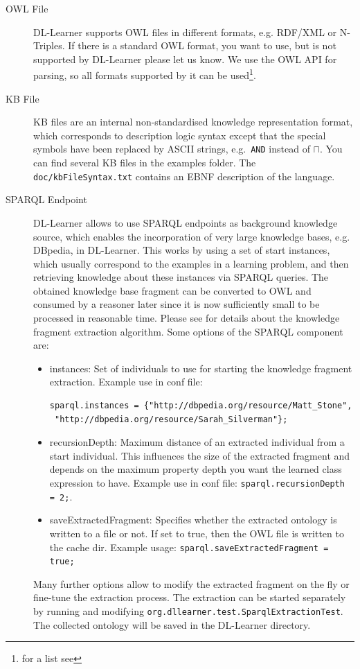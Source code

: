 \documentclass[a4paper,12pt]{scrartcl}
\begin{document}
\begin{description}
 \item[OWL File] DL-Learner supports OWL files in different formats, e.g. RDF/XML or N-Triples. If there is a standard OWL format, you want to use, but is not supported by DL-Learner please let us know. We use the OWL API for parsing, so all formats supported by it can be used\footnote{ for a list see \owlapi}.
 \item[KB File] KB files are an internal non-standardised knowledge representation format, which corresponds to description logic syntax except that the special symbols have been replaced by ASCII strings, e.g.~\verb|AND| instead of $\sqcap$. You can find several KB files in the examples folder. The \verb|doc/kbFileSyntax.txt| contains an EBNF description of the language.
 \item[SPARQL Endpoint] DL-Learner allows to use SPARQL endpoints as background knowledge source, which enables the incorporation of very large knowledge bases, e.g. DBpedia\cite{2008_dbpedia}, in DL-Learner. This works by using a set of start instances, which usually correspond to the examples in a learning problem, and then retrieving knowledge about these instances via SPARQL queries. The obtained knowledge base fragment can be converted to OWL and consumed by a reasoner later since it is now sufficiently small to be processed in reasonable time. Please see \cite{2009_ijswis} for details about the knowledge fragment extraction algorithm. Some options of the SPARQL component are:
\begin{itemize}
 \item instances: Set of individuals to use for starting the knowledge fragment extraction. Example use in conf file: \begin{verbatim}sparql.instances = {"http://dbpedia.org/resource/Matt_Stone",
 "http://dbpedia.org/resource/Sarah_Silverman"};\end{verbatim}
 \item recursionDepth: Maximum distance of an extracted individual from a start individual. This influences the size of the extracted fragment and depends on the maximum property depth you want the learned class expression to have. Example use in conf file: \verb|sparql.recursionDepth = 2;|.
\item saveExtractedFragment: Specifies whether the extracted ontology is written to a file or not. If set to true, then the OWL file is written to the cache dir. Example usage: \verb|sparql.saveExtractedFragment = true;|
\end{itemize}
 Many further options allow to modify the extracted fragment on the fly or fine-tune the extraction process.
The extraction can be started separately by running and modifying \verb|org.dllearner.test.SparqlExtractionTest|. The collected ontology will be saved in the DL-Learner directory.
\end{description}
\end{document}

